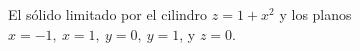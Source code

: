 \item El sólido limitado por el cilindro $z = 1 + x^2$ y los planos $x = -1, \ x = 1, \ y = 0, \ y = 1$, y $z = 0$.
